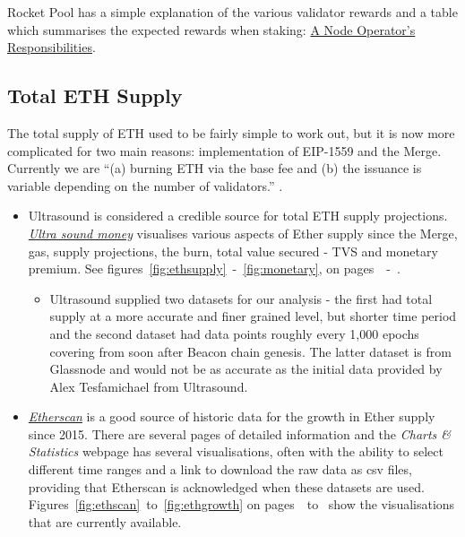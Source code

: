 \documentclass[UTF8]{article}
\begin{document}
Rocket Pool has a simple explanation of the various validator rewards and a table which summarises the expected rewards when staking: \href{https://docs.rocketpool.net/guides/node/responsibilities.html}{A Node Operator's Responsibilities}.
\clearpage
 \subsection{Total ETH Supply}
\label{sec:ethsupply} 
        The total supply of ETH used to be fairly simple to work out, but it is now more complicated for two main reasons:  implementation of EIP-1559 and the Merge.
Currently we are ``(a) burning ETH via the base fee and (b) the issuance is variable depending on the number of validators.'' \cite{Edgington2023}. 
\begin{itemize}
	\item Ultrasound is considered a credible source for total ETH supply projections. \\\textit{\href{https://ultrasound.money/}{Ultra sound money}} visualises various aspects of Ether supply since the Merge, gas, supply projections, the burn, total value secured - TVS and monetary premium. See figures~\ref{fig:ethsupply}~-~\ref{fig:monetary}, on pages~\pageref{fig:ethsupply}~-~\pageref{fig:monetary}.  

\begin{itemize}
	\item Ultrasound supplied two datasets for our analysis - the first had total supply at a more accurate and finer grained level, but shorter time period and the second dataset had data points roughly every 1,000 epochs covering from soon after Beacon chain genesis. The latter dataset is from Glassnode and would not be as accurate as the initial data provided by Alex Tesfamichael from Ultrasound.
\end{itemize}
	\item \textit{\href{https://etherscan.io/chart/ethersupplygrowth}{Etherscan}} is a good source of historic data for the growth in Ether supply since 2015. There are several pages of detailed information and the \textit{Charts \& Statistics} webpage has several visualisations, often with the ability to select different time ranges and a link to download the raw data as csv files, providing that Etherscan is acknowledged when these datasets are used.\\
	Figures~\ref{fig:ethscan}~to~\ref{fig:ethgrowth} on pages~\pageref{fig:ethscan}~to~\pageref{fig:ethgrowth} show the visualisations that are currently available.
\end{itemize}
\end{document}
